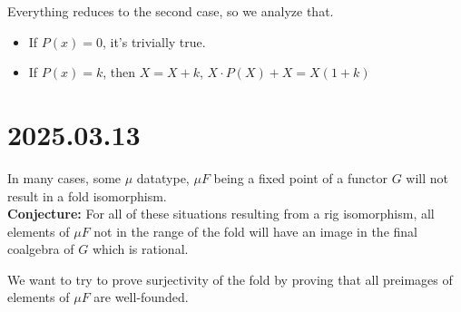 \documentclass[letterpaper,numbers=enddot]{scrartcl}
\begin{document}
Everything reduces to the second case, so we analyze that.
\begin{itemize}
  \item If $P(x)=0$, it's trivially true.
  \item If $P(x) = k$, then $X = X + k$, $X \cdot P(X) + X = X (1 + k)$
\end{itemize}

\section{2025.03.13}

In many cases, some $\mu$ datatype, $\mu F$ being a fixed point of a functor $G$ will not result in a fold isomorphism. \\
\textbf{Conjecture: } For all of these situations resulting from a rig isomorphism, all elements of $\mu F$ not in the range of the fold will have an image in the final coalgebra of $G$ which is rational.

We want to try to prove surjectivity of the fold by proving that all preimages of elements of $\mu F$ are well-founded.
\end{document}
